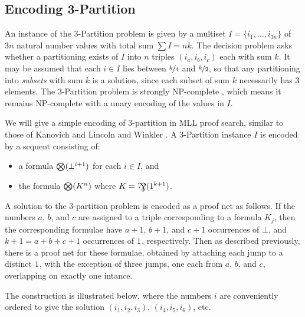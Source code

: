 \documentclass{lmcs}
\let\capsabbrev=\uppercase
\begin{document}

\subsection*{Encoding 3-Partition}

An instance of the 3-Partition problem is given by a multiset $I=\{i_1,\dotsc,i_{3n}\}$ of $3n$ natural number values with total sum $\sum I=nk$. The decision problem asks whether a partitioning exists of $I$ into $n$ triples $(i_a,i_b,i_c)$ each with sum $k$. It may be assumed that each $i\in I$ lies between $\nicefrac k4$ and $\nicefrac k2$, so that any partitioning into \emph{subsets} with sum $k$ is a solution, since each subset of sum $k$ necessarily has $3$ elements. The 3-Partition problem is strongly \capsabbrev{np}-complete \cite{GareyAndJohnson}, which means it remains \capsabbrev{np}-complete with a unary encoding of the values in $I$.

We will give a simple encoding of 3-partition in MLL proof search, similar to those of Kanovich \cite{Kanovich-1992} and Lincoln and Winkler \cite{Lincoln-Winkler-1994}. A 3-Partition instance $I$ is encoded by a sequent consisting of:
\begin{itemize}
	\item a formula $\bigotimes(\bot^{i+1})$ for each $i\in I$, and
	\item the formula $\bigotimes(K^n)$ where $K=\bigparr(\1^{k+1})$.
\end{itemize}
A solution to the 3-partition problem is encoded as a proof net as follows. If the numbers $a$, $b$, and $c$ are assigned to a triple corresponding to a formula $K_j$, then the corresponding formulae have $a+1$, $b+1$, and $c+1$ occurrences of $\bot$, and $k+1=a+b+c+1$ occurrences of $1$, respectively. Then as described previously, there is a proof net for these formulae, obtained by attaching each jump to a distinct $1$, with the exception of three jumps, one each from $a$, $b$, and $c$, overlapping on exactly one intance.

The construction is illustrated below, where the numbers $i$ are conveniently ordered to give the solution $(i_1,i_2,i_3)$, $(i_4,i_5,i_6)$, etc.
\end{document}
